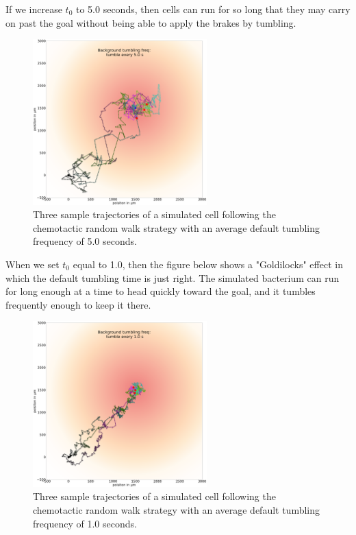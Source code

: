 If we increase $t_0$ to 5.0 seconds, then cells can run for so long that they may carry on past the goal without being able to apply the brakes by tumbling.

\begin{figure}[h]
\centering
\mySfFamily
\includegraphics[width = 0.6\textwidth]{../images/chemotaxis_traj_5.0_uniform.png}
\caption{Three sample trajectories of a simulated cell following the chemotactic random walk strategy with an average default tumbling frequency of 5.0 seconds.}
\label{fig:chemotaxis_traj_5.0_uniform}
\end{figure}


When we set $t_0$ equal to 1.0, then the figure below shows a "Goldilocks" effect in which the default tumbling time is just right. The simulated bacterium can run for long enough at a time to head quickly toward the goal, and it tumbles frequently enough to keep it there.

\begin{figure}[h]
\centering
\mySfFamily
\includegraphics[width = 0.6\textwidth]{../images/chemotaxis_traj_1.0_uniform.png}
\caption{Three sample trajectories of a simulated cell following the chemotactic random walk strategy with an average default tumbling frequency of 1.0 seconds.}
\label{fig:chemotaxis_traj_1.0_uniform}
\end{figure}


